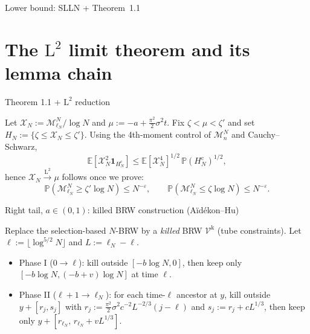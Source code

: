 \documentclass[10pt, aspectratio=169]{beamer}
\newcommand{\E}{\mathbb{E}}
\renewcommand{\P}{\mathbb{P}}
\begin{document}
\begin{frame}{Lower bound: SLLN + Theorem~1.1}
    
\end{frame}


\section{The $\mathrm L^2$ limit theorem and its lemma chain}

\begin{frame}{Theorem 1.1 + $\mathrm L^2$ reduction}
    \small
    
    \vspace{-1mm}
    Let $\mathcal X_N:=\mathcal M^N_{\ell_N}/\log N$ and $\mu:=-a+\frac{\pi^2}{2}\sigma^2 t$.
    Fix $\zeta<\mu<\zeta'$ and set $H_N:=\{\zeta\le \mathcal X_N\le \zeta'\}$.
    Using the {\color{blue!60!black}4th-moment control} of $\mathcal M^N_n$ and Cauchy--Schwarz,
    \[
        \E[\mathcal X_N^2\mathbf 1_{H_N^{\mathrm c}}]
        \le
        \E[\mathcal X_N^4]^{1/2}\,\P(H_N^{\mathrm c})^{1/2},
    \]
    hence $\mathcal X_N\xrightarrow{\mathrm L^2}\mu$ follows once we prove:
    \[
        \P(\mathcal M^N_{\ell_N}\ge \zeta'\log N)\le N^{-\varepsilon},
        \qquad
        \P(\mathcal M^N_{\ell_N}\le \zeta\log N)\le N^{-\varepsilon}.
    \]
\end{frame}

\begin{frame}{Right tail, $a\in(0,1)$: killed BRW construction (A\"id\'ekon--Hu)}
    \small
    \begin{center}
        \resizebox{!}{0.56\textheight}{}
    \end{center}
    \vspace{-2mm}
    \footnotesize
    Replace the selection-based $N$-BRW by a \emph{killed} BRW $\mathcal V^{\mathrm k}$ (tube constraints).
    Let $\ell:=\lfloor\log^{5/2}N\rfloor$ and $L:=\ell_N-\ell$.
    \vspace{-1mm}
    \begin{itemize}
        \item Phase I ($0\to \ell$): kill outside $[-b\log N,0]$, then keep only $[-b\log N,(-b+v)\log N]$ at time $\ell$.
        \item Phase II ($\ell+1\to \ell_N$): for each time-$\ell$ ancestor at $y$, kill outside $y+[r_j,s_j]$ with
        $r_j:=\frac{\pi^2}{2}\sigma^2c^{-2}L^{-2/3}(j-\ell)$ and $s_j:=r_j+cL^{1/3}$, then keep only $y+[r_{\ell_N},\,r_{\ell_N}+vL^{1/3}]$.
    \end{itemize}
\end{frame}
\end{document}
